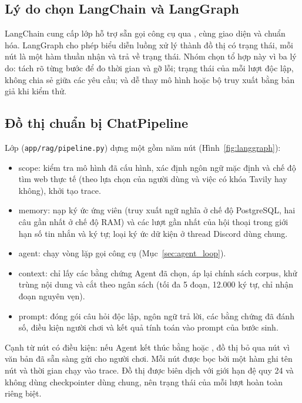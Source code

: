 \subsection{Lý do chọn LangChain và LangGraph}
\label{sec:why_langgraph}

LangChain cung cấp lớp  hỗ trợ sẵn gọi công cụ qua , cùng giao diện  và  chuẩn hóa. LangGraph cho phép biểu diễn luồng xử lý thành đồ thị có trạng thái, mỗi nút là một hàm thuần nhận và trả về trạng thái. Nhóm chọn tổ hợp này vì ba lý do: tách rõ từng bước để đo thời gian và gỡ lỗi; trạng thái của mỗi lượt độc lập, không chia sẻ giữa các yêu cầu; và dễ thay mô hình hoặc bộ truy xuất bằng bản giả khi kiểm thử.

\subsection{Đồ thị chuẩn bị ChatPipeline}
\label{sec:pipeline_graph}

Lớp  (\nolinkurl{app/rag/pipeline.py}) dựng một  gồm năm nút (Hình~\ref{fig:langgraph}):
\begin{itemize}
    \item scope: kiểm tra mô hình đã cấu hình, xác định ngôn ngữ mặc định và chế độ tìm web thực tế (theo lựa chọn của người dùng và việc có khóa Tavily hay không), khởi tạo trace.
    \item memory: nạp ký ức ứng viên (truy xuất ngữ nghĩa ở chế độ PostgreSQL, hai câu gần nhất ở chế độ RAM) và các lượt gần nhất của hội thoại trong giới hạn số tin nhắn và ký tự; loại ký ức dữ kiện ở thread Discord dùng chung.
    \item agent: chạy vòng lặp gọi công cụ (Mục~\ref{sec:agent_loop}).
    \item context: chỉ lấy các bằng chứng Agent đã chọn, áp lại chính sách corpus, khử trùng nội dung và cắt theo ngân sách (tối đa 5 đoạn, 12.000 ký tự, chỉ nhận đoạn nguyên vẹn).
    \item prompt: đóng gói câu hỏi độc lập, ngôn ngữ trả lời, các bằng chứng đã đánh số, điều kiện người chơi và kết quả tính toán vào prompt của bước sinh.
\end{itemize}
Cạnh từ nút  có điều kiện: nếu Agent kết thúc bằng  hoặc , đồ thị bỏ qua nút  vì văn bản đã sẵn sàng gửi cho người chơi. Mỗi nút được bọc bởi một hàm ghi tên nút và thời gian chạy vào trace. Đồ thị được biên dịch với giới hạn đệ quy 24 và không dùng checkpointer dùng chung, nên trạng thái của mỗi lượt hoàn toàn riêng biệt.

